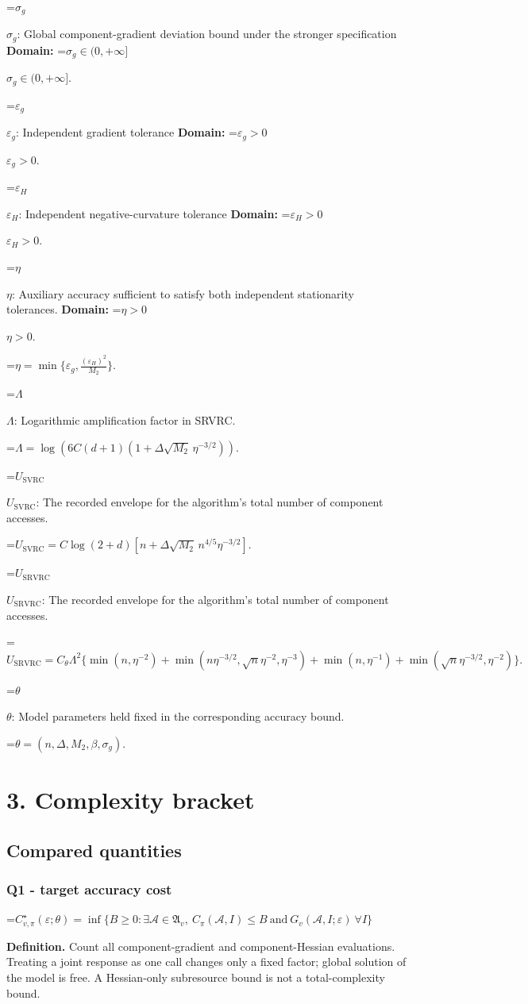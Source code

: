 \documentclass[10pt,a4paper]{article}
\newcommand{\AtlasMath}[1]{\par\begingroup\centering\setbox0=\hbox{$\displaystyle #1$}\ifdim\wd0>1.4\linewidth\typeout{ATLAS WIDE FORMULA: \the\wd0}\fi\ifdim\wd0>\linewidth\resizebox{\linewidth}{!}{\box0}\else\box0\fi\par\endgroup}
\newcommand{\AtlasInlineMath}[1]{\begingroup\setbox0=\hbox{$#1$}\ifdim\wd0>.4\linewidth\endgroup\AtlasMath{#1}\else\endgroup$#1$\fi}
\begin{document}
\AtlasInlineMath{\sigma_g}: Global component-gradient deviation bound under the stronger specification \textbf{Domain:} \AtlasInlineMath{\sigma_g\in(0,+\infty]}.

\AtlasInlineMath{\varepsilon_g}: Independent gradient tolerance \textbf{Domain:} \AtlasInlineMath{\varepsilon_g>0}.

\AtlasInlineMath{\varepsilon_H}: Independent negative-curvature tolerance \textbf{Domain:} \AtlasInlineMath{\varepsilon_H>0}.

\AtlasInlineMath{\eta}: Auxiliary accuracy sufficient to satisfy both independent stationarity tolerances. \textbf{Domain:} \AtlasInlineMath{\eta>0}.


\AtlasMath{\eta=\min\{\varepsilon_g,\frac{(\varepsilon_H)^{2}}{M_2}\}.}


\AtlasInlineMath{\Lambda}: Logarithmic amplification factor in SRVRC.


\AtlasMath{\Lambda=\log\!\left(6C(d+1)(1+\Delta\sqrt{M_2}\,\eta^{-3/2})\right).}


\AtlasInlineMath{U_{\mathrm{SVRC}}}: The recorded envelope for the algorithm's total number of component accesses.


\AtlasMath{U_{\mathrm{SVRC}}=C\log(2+d)[n+\Delta\sqrt{M_2}\,n^{4/5}\eta^{-3/2}].}


\AtlasInlineMath{U_{\mathrm{SRVRC}}}: The recorded envelope for the algorithm's total number of component accesses.


\AtlasMath{U_{\mathrm{SRVRC}}=C_\theta\Lambda^2\{\min(n,\eta^{-2})+\min(n\eta^{-3/2},\sqrt n\eta^{-2},\eta^{-3})+\min(n,\eta^{-1})+\min(\sqrt n\eta^{-3/2},\eta^{-2})\}.}


\AtlasInlineMath{\theta}: Model parameters held fixed in the corresponding accuracy bound.


\AtlasMath{\theta=(n,\Delta,M_2,\beta,\sigma_g).}


\section{3. Complexity bracket}
\subsection{Compared quantities}
\subsubsection{Q1 - target accuracy cost}
\AtlasMath{C^\star_{v,\pi}(\varepsilon;\theta)=\inf\{B\ge0:\exists\mathcal A\in\mathfrak A_v,\ C_\pi(\mathcal A,I)\le B\ \text{and}\ G_v(\mathcal A,I;\varepsilon)\ \forall I\}}
\textbf{Definition.} Count all component-gradient and component-Hessian evaluations. Treating a joint response as one call changes only a fixed factor; global solution of the model is free. A Hessian-only subresource bound is not a total-complexity bound.
\end{document}
